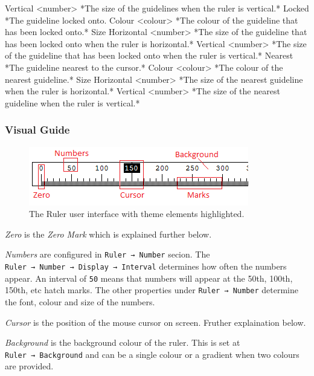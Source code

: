 \documentclass[
]{book}
\newenvironment{Shaded}{\begin{snugshade}}{\end{snugshade}}
\newcommand{\AttributeTok}[1]{\textcolor[rgb]{0.77,0.63,0.00}{#1}}
\begin{document}
\begin{Shaded}
\begin{Highlighting}[]
\AttributeTok{        Vertical <number> *The size of the guidelines when the ruler is vertical.*}
\AttributeTok{    Locked *The guideline locked onto.}
\AttributeTok{      Colour <colour> *The colour of the guideline that has been locked onto.*}
\AttributeTok{      Size}
\AttributeTok{        Horizontal <number> *The size of the guideline that has been locked onto when the ruler is horizontal.*}
\AttributeTok{        Vertical <number> *The size of the guideline that has been locked onto when the ruler is vertical.*}
\AttributeTok{    Nearest *The guideline nearest to the cursor.*}
\AttributeTok{      Colour <colour> *The colour of the nearest guideline.*}
\AttributeTok{      Size}
\AttributeTok{        Horizontal <number> *The size of the nearest guideline when the ruler is horizontal.*}
\AttributeTok{        Vertical <number> *The size of the nearest guideline when the ruler is vertical.*}
\end{Highlighting}
\end{Shaded}

\hypertarget{visual-guide}{%
\subsubsection{Visual Guide}\label{visual-guide}}

\begin{figure}
\centering
\includegraphics{images/ruler-theme.png}
\caption{\label{fig:unnamed-chunk-3}The Ruler user interface with theme elements highlighted.}
\end{figure}

\emph{Zero} is the \emph{Zero Mark} which is explained further below.

\emph{Numbers} are configured in \texttt{Ruler\ →\ Number} secion.
The \texttt{Ruler\ →\ Number\ →\ Display\ →\ Interval} determines how often the numbers appear.
An interval of \texttt{50} means that numbers will appear at the 50th, 100th, 150th, etc hatch marks.
The other properties under \texttt{Ruler\ →\ Number} determine the font, colour and size of the numbers.

\emph{Cursor} is the position of the mouse cursor on screen.
Fruther explaination below.

\emph{Background} is the background colour of the ruler.
This is set at \texttt{Ruler\ →\ Background} and can be a single colour or a gradient when two colours are provided.
\end{document}
